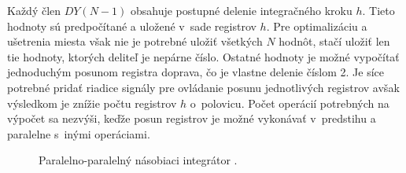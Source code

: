 Každý člen $ DY(N-1) $ obsahuje postupné delenie integračného kroku $ h $. Tieto hodnoty sú predpočítané a uložené v~sade registrov $ h $. Pre optimalizáciu a ušetrenia miesta však nie je potrebné uložiť všetkých $ N $ hodnôt, stačí uložiť len tie hodnoty, ktorých deliteľ je nepárne číslo. Ostatné hodnoty je možné vypočítať jednoduchým posunom registra doprava, čo je vlastne delenie číslom 2. Je síce potrebné pridať riadice signály pre ovládanie posunu jednotlivých registrov avšak výsledkom je znížie počtu registrov $ h $ o~polovicu. Počet operácií potrebných na výpočet sa nezvýši, keďže posun registrov je možné vykonávať v~predstihu a paralelne s~inými operáciami.

\bigskip
\begin{figure}[h]
\centering
{}
\caption{Paralelno-paralelný násobiaci integrátor \cite{ZavadaBP}.}
\label{ppni}
\end{figure}

